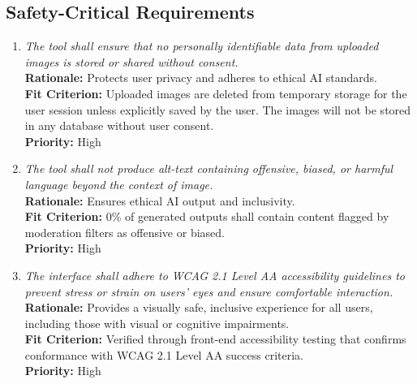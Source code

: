 \documentclass[12pt]{article}
\begin{document}
\subsection{Safety-Critical Requirements}
\begin{enumerate}[label=PR-SCR \arabic*., wide=0pt, leftmargin=*]
\item \emph{The tool shall ensure that no personally identifiable data from uploaded images is stored or shared without consent.}\\[2mm] 
    {\bf Rationale:} Protects user privacy and adheres to ethical AI standards.\\
    {\bf Fit Criterion:} Uploaded images are deleted from temporary storage for the user session unless explicitly saved by the user. The images will not be stored in any database without user consent.\\
    {\bf Priority:} High

\item \emph{The tool shall not produce alt-text containing offensive, biased, or harmful language beyond the context of image.}\\[2mm] 
    {\bf Rationale:} Ensures ethical AI output and inclusivity.\\
    {\bf Fit Criterion:} 0\% of generated outputs shall contain content flagged by moderation filters as offensive or biased.\\
    {\bf Priority:} High

\item \emph{The interface shall adhere to WCAG 2.1 Level AA accessibility guidelines to prevent stress or strain on users’ eyes and ensure comfortable interaction.}\\[2mm] 
    {\bf Rationale:} Provides a visually safe, inclusive experience for all users, including those with visual or cognitive impairments.\\
    {\bf Fit Criterion:} Verified through front-end accessibility testing that confirms conformance with WCAG 2.1 Level AA success criteria.\\
    {\bf Priority:} High
\end{enumerate}
\end{document}
